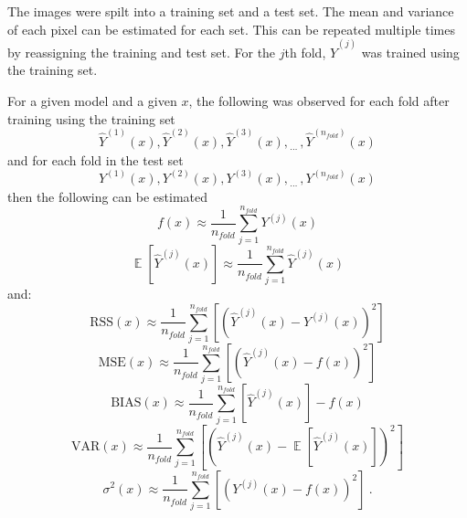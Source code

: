 \documentclass[12pt, a4paper]{memoir}
\DeclareMathOperator{\expectation}{\mathbb{E}}
\newcommand{\dotdotdot}{_{\phantom{.}\cdots}}
\begin{document}
The images were spilt into a training set and a test set. The mean and variance of each pixel can be estimated for each set. This can be repeated multiple times by reassigning the training and test set. For the $j$th fold, $\widehat{Y}^{(j)}$ was trained using the training set.

For a given model and a given $x$, the following was observed for each fold after training using the training set
\begin{equation}
\widehat{Y}^{(1)}(x),\widehat{Y}^{(2)}(x),\widehat{Y}^{(3)}(x),\dotdotdot,\widehat{Y}^{(n_{fold})}(x)
\end{equation}
and for each fold in the test set
\begin{equation}
Y^{(1)}(x),Y^{(2)}(x),Y^{(3)}(x),\dotdotdot,Y^{(n_{fold})}(x)
\end{equation}
then the following can be estimated
\begin{equation}
f(x) \approx \frac{1}{n_{fold}}\sum_{j=1}^{n_{fold}}Y^{(j)}(x)
\end{equation}
\begin{equation}
\expectation\left[\widehat{Y}^{(j)}(x)\right] \approx \frac{1}{n_{fold}}\sum_{j=1}^{n_{fold}}\widehat{Y}^{(j)}(x)
\end{equation}
and:
\begin{equation}
\text{RSS}(x) \approx \frac{1}{n_{fold}}\sum_{j=1}^{n_{fold}} \left[
\left(\widehat{Y}^{(j)}(x) - Y^{(j)}(x)\right)^2
\right]
\end{equation}
\begin{equation}
\text{MSE}(x) \approx \frac{1}{n_{fold}}\sum_{j=1}^{n_{fold}} \left[
\left(\widehat{Y}^{(j)}(x)-f(x)\right)^2
\right]
\end{equation}
\begin{equation}
\text{BIAS}(x) \approx \frac{1}{n_{fold}}\sum_{j=1}^{n_{fold}} 
\left[\widehat{Y}^{(j)}(x)\right] - f(x)
\end{equation}
\begin{equation}
\text{VAR}(x) \approx \frac{1}{n_{fold}}\sum_{j=1}^{n_{fold}} \left[
\left(\widehat{Y}^{(j)}(x) - \expectation\left[\widehat{Y}^{(j)}(x)\right]\right)^2
\right]
\end{equation}
\begin{equation}
\sigma^2(x) \approx \frac{1}{n_{fold}}\sum_{j=1}^{n_{fold}} \left[
\left(Y^{(j)}(x) - f(x)\right)^2
\right] \ .
\end{equation}

\clearpage
\end{document}
